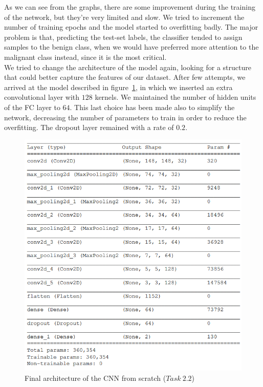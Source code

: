 \documentclass[11pt,a4paper,oneside]{article}
\begin{document}
As we can see from the graphs, there are some improvement during the training of the network, but they're very limited and slow. We tried to increment the number of training epochs and the model started to overfitting badly. The major problem is that, predicting the test-set labels, the classifier tended to assign samples to the benign class, when we would have preferred more attention to the malignant class instead, since it is the most critical.\\

We tried to change the architecture of the model again, looking for a structure that could better capture the features of our dataset. After few attempts, we arrived at the model described in figure~\ref{fig:model_2.2_1}, in which we inserted an extra convolutional layer with $128$ kernels. We maintained the number of hidden units of the FC layer to $64$. This last choice has been made also to simplify the network, decreasing the number of parameters to train in order to reduce the overfitting. The dropout layer remained with a rate of $0.2$.

\begin{figure}[h]
\centering
\includegraphics[width=.45\textwidth]{images/2.2/1_model}
\caption{Final architecture of the CNN from scratch ($Task\ 2.2$)}
\label{fig:model_2.2_1}
\end{figure}

\clearpage
\end{document}
